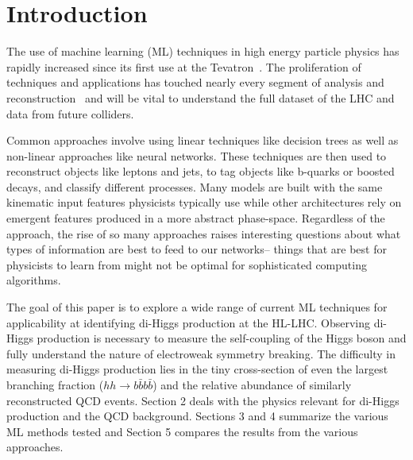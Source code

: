 \section{Introduction}
\label{sec:intro}

The use of machine learning (ML) techniques in high energy particle physics has rapidly increased since its first use at the Tevatron~\cite{Abazov:2006gd, Aaltonen:2008sy}. The proliferation of techniques and applications has touched nearly every segment of analysis and reconstruction~\cite{albertsson2018machine} and will be vital to understand the full dataset of the LHC and data from future colliders.

Common approaches involve using linear techniques like decision trees as well as non-linear approaches like neural networks. These techniques are then used to reconstruct objects like leptons and jets, to tag objects like b-quarks or boosted decays, and classify different processes. Many models are built with the same kinematic input features physicists typically use while other architectures rely on emergent features produced in a more abstract phase-space. Regardless of the approach, the rise of so many approaches raises interesting questions about what types of information are best to feed to our networks-- things that are best for physicists to learn from might not be optimal for sophisticated computing algorithms.

The goal of this paper is to explore a wide range of current ML techniques for applicability at identifying di-Higgs production at the HL-LHC. Observing di-Higgs production is necessary to measure the self-coupling of the Higgs boson and fully understand the nature of electroweak symmetry breaking. The difficulty in measuring di-Higgs production lies in the tiny cross-section of even the largest branching fraction ($hh\rightarrow b\bar{b}b\bar{b}$) and the relative abundance of similarly reconstructed QCD events. Section 2 deals with the physics relevant for di-Higgs production and the QCD background. Sections 3 and 4 summarize the various ML methods tested and Section 5 compares the results from the various approaches.
